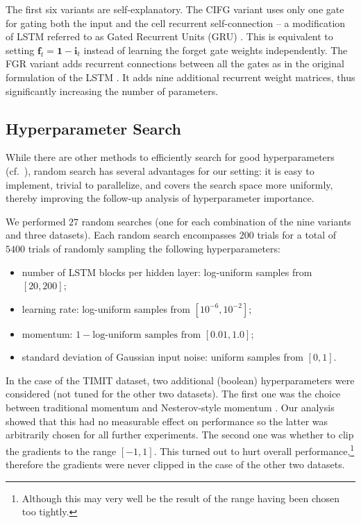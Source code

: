 The first six variants are self-explanatory. The CIFG variant uses only one gate for gating both the input and the cell recurrent self-connection -- a modification of LSTM referred to as Gated Recurrent Units (GRU) \cite{Cho2014}. This is equivalent to setting ${\mathbf{f}_t = \mathbf{1} - \mathbf{i}_t}$ instead of learning the forget gate weights independently. The FGR variant adds recurrent connections between all the gates as in the original formulation of the LSTM \cite{Hochreiter1997}. It adds nine additional recurrent weight matrices, thus significantly increasing the number of parameters.

\subsection{Hyperparameter Search}
\label{sec:hyperparam_search}
While there are other methods to efficiently search for good hyperparameters (cf.~\cite{Snoek2012, Hutter2011}), random search has several advantages for our setting: it is easy to implement, trivial to parallelize, and covers the search space more uniformly, thereby improving the follow-up analysis of hyperparameter importance.

We performed $27$ random searches (one for each combination of the nine variants and three datasets). Each random search encompasses $200$ trials for a total of $5400$ trials of randomly sampling the following hyperparameters:\\[-1em]

\begin{itemize}[leftmargin=*]

    \item number of LSTM blocks per hidden layer: log-uniform samples from $[20, 200]$;
    \item learning rate: log-uniform samples from $[10^{-6}, 10^{-2}]$;
    \item momentum: $1 - \text{log-uniform samples from $[0.01, 1.0]$}$;
    \item standard deviation of Gaussian input noise: uniform samples from $[0, 1]$.
\end{itemize}

In the case of the TIMIT dataset, two additional (boolean) hyperparameters were considered (not tuned for the other two datasets). The first one was the choice between traditional momentum and Nesterov-style momentum \citep{Sutskever2013}. Our analysis showed that this had no measurable effect on performance so the latter was arbitrarily chosen for all further experiments. The second one was whether to clip the gradients to the range $[-1, 1]$. This turned out to hurt overall performance,\footnote{Although this may very well be the result of the range having been chosen too tightly.} therefore the gradients were never clipped in the case of the other two datasets.

